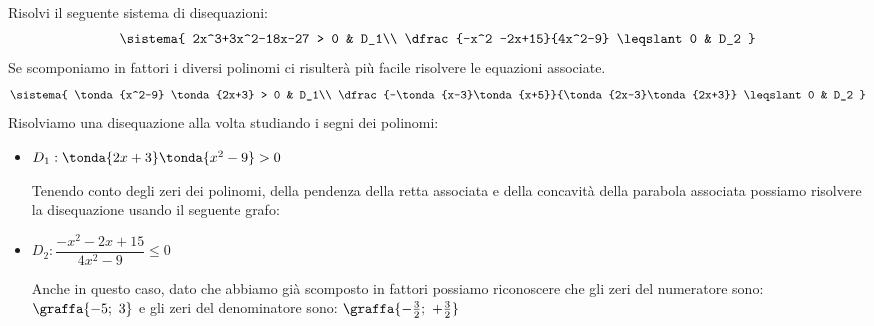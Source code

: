 \begin{esempio}
 
Risolvi il seguente sistema di disequazioni:
\[\sistema{
    2x^3+3x^2-18x-27 > 0 & D_1\\
    \dfrac{-x^2 -2x+15}{4x^2-9} \leqslant 0 & D_2
  }
\]
Se scomponiamo in fattori i diversi polinomi ci risulterà più facile 
risolvere le equazioni associate.
\[\sistema{
    \tonda{x^2-9} \tonda{2x+3} > 0 & D_1\\
    \dfrac{-\tonda{x-3}\tonda{x+5}}{\tonda{2x-3}\tonda{2x+3}} \leqslant 0 & 
D_2
  }
\]
Risolviamo una disequazione alla volta studiando i segni dei polinomi:

\begin{itemize}
 \item \(D_1: \tonda{2x+3} \tonda{x^2-9}>0\)

\begin{minipage}{.44\textwidth}
Tenendo conto degli zeri dei polinomi, della pendenza della retta associata 
e della concavità della parabola associata possiamo risolvere la disequazione 
usando il seguente grafo:
\end{minipage}
\hfill
\begin{minipage}{.54\textwidth}
\begin{center} \segnosistemaaa \end{center}
\end{minipage}

 \item \(D_2: \dfrac{-x^2 -2x+15}{4x^2-9} \leqslant 0\)

Anche in questo caso, dato che abbiamo già scomposto in fattori possiamo 
riconoscere che gli zeri del numeratore sono:
\(\graffa{-5;~3}\) 
e gli zeri del denominatore sono:
\(\graffa{-\frac{3}{2};~+\frac{3}{2}}\) 

\end{itemize}


\end{esempio}
